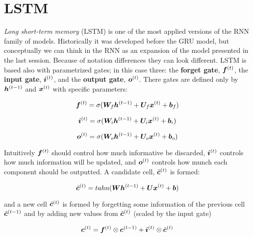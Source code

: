  

\section{LSTM}
\label{sec:LSTM}


\textit{Long short-term memory} (LSTM) is one of the most applied versions of the RNN family of models. Historically it was developed before the GRU model, but conceptually we can think in the RNN as an expansion of the model presented in the last session. Because of notation differences they can look different. LSTM is based also with parametrized gates; in this case three: the \textbf{forget gate}, $\bm{f}^{(t)}$, the \textbf{input gate}, $\bm{i}^{(t)}$, and the \textbf{output gate}, $\bm{o}^{(t)}$. There gates are defined only by $\bm{h}^{(t-1)}$ and $\bm{x}^{(t)}$ with specific parameters:

\begin{equation}
\bm{f}^{(t)} = \sigma(\bm{W}_{f} \bm{h}^{(t-1)} + \bm{U}_{f} \bm{x}^{(t)} + \bm{b}_{f})
\end{equation}

\begin{equation}
\bm{i}^{(t)} = \sigma(\bm{W}_{i} \bm{h}^{(t-1)} + \bm{U}_{i} \bm{x}^{(t)} + \bm{b}_{i})
\end{equation}

\begin{equation}
\bm{o}^{(t)} = \sigma(\bm{W}_{o} \bm{h}^{(t-1)} + \bm{U}_{o} \bm{x}^{(t)} + \bm{b}_{o})
\end{equation}

Intuitively $\bm{f}^{(t)}$ should control how much informative be discarded, $\bm{i}^{(t)}$ controls how much information will be updated, and $\bm{o}^{(t)}$ controls how munch each component should be outputted. A candidate cell, $\tilde{\bm{c}}^{(t)}$ is formed:

\begin{equation}
\tilde{\bm{c}}^{(t)} = tahn(\bm{W} \bm{h}^{(t-1)} + \bm{U} \bm{x}^{(t)} + \bm{b})
\end{equation}

and a new cell $\tilde{\bm{c}}^{(t)}$ is formed by forgetting some information of the previous cell $\tilde{\bm{c}}^{(t-1)}$ and by adding new values from $\tilde{\bm{c}}^{(t)}$ (scaled by the input gate)

\begin{equation}
\bm{c}^{(t)} = \bm{f}^{(t)} \otimes \bm{c}^{(t-1)} + \bm{i}^{(t)}\otimes \tilde{\bm{c}}^{(t)}
\end{equation}

